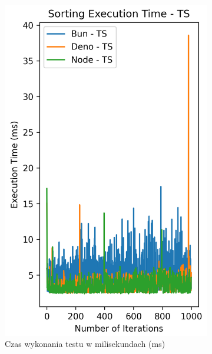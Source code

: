\begin{figure}[H]
  \centering
  \begin{subfigure}[b]{0.4\textwidth}
    \centering
    \includegraphics[width=\textwidth]{Figures/sorting/sorting_quick_1000_10000_ts_time.png}
    \caption{Czas wykonania testu w milisekundach (ms)}
    \label{fig:quick_sorting_e4_ts_time}
  \end{subfigure}
  \begin{subfigure}[b]{0.4\textwidth}
    \centering

\end{subfigure}
\end{figure}
